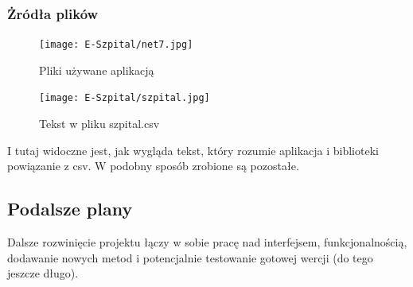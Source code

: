 \subsubsection{Żródła plików}
\begin{figure}[!ht]
	\centering
		\texttt{[image: E-Szpital/net7.jpg]}
	\caption{\footnotesize Pliki używane aplikacją}
	\label{fig:plotend}
\end{figure}\newline
\begin{figure}[!ht]
	\centering
		\texttt{[image: E-Szpital/szpital.jpg]}
	\caption{\footnotesize Tekst w pliku szpital.csv}
	\label{fig:plotend}
\end{figure}\newline
I tutaj widoczne jest, jak wygląda tekst, który rozumie aplikacja i biblioteki powiązanie z csv. W podobny sposób zrobione są pozostałe.
\newpage\subsection{Podalsze plany}
Dalsze rozwinięcie projektu łączy w sobie pracę nad interfejsem, funkcjonalnością, dodawanie nowych metod i potencjalnie testowanie gotowej wercji (do tego jeszcze długo).
